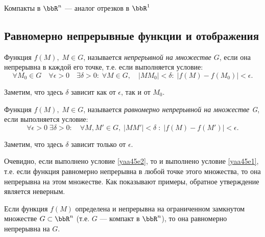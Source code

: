 Компакты в $\bbR^n$ --- аналог отрезков в $\bbR^1$



\subsection{Равномерно непрерывные функции и отображения}

\begin{defn}
Функция $f(M),\;M\in G$, называется \textit{непрерывной на множестве $G$}, если она непрерывна в каждой его точке, т.е. если выполняется условие:
\begin{equation}\label{yaa45e1}
\forall M_0\in G\quad \forall\epsilon>0 \quad \exists\delta>0:\;\forall M\in G,\quad |MM_0|<\delta:\;|f(M)-f(M_0)|<\epsilon.
\end{equation}
\end{defn}
Заметим, что здесь $\delta$ зависит как от $\epsilon$, так и от $M_0$.

\begin{defn}
Функция $f(M),\; M\in G$, называется \textit{равномерно непрерывной на множестве G}, если выполняется условие:
\begin{equation}\label{yaa45e2}
\forall\epsilon>0\;\exists\delta>0:\quad\forall M, M'\in G,\; |MM'|<\delta\; :\; |f(M)-f(M')|<\epsilon.
\end{equation}
\end{defn}
Заметим, что здесь $\delta$ зависит только от $\epsilon$.

Очевидно, если выполнено условие \eqref{yaa45e2}, то и выполнено условие \eqref{yaa45e1}, т.е. если функция равномерно непрерывна в любой точке этого множества, то она непрерывна на этом множестве. Как показывают примеры, обратное утверждение является неверным.

\begin{thm}
Если функция $f(M)$ определена и непрерывна на ограниченном замкнутом множестве $G\subset\bbR^n$ (т.е. $G$ --- компакт в $\bbR^n$), то она равномерно непрерывна на $G$.
\end{thm}

